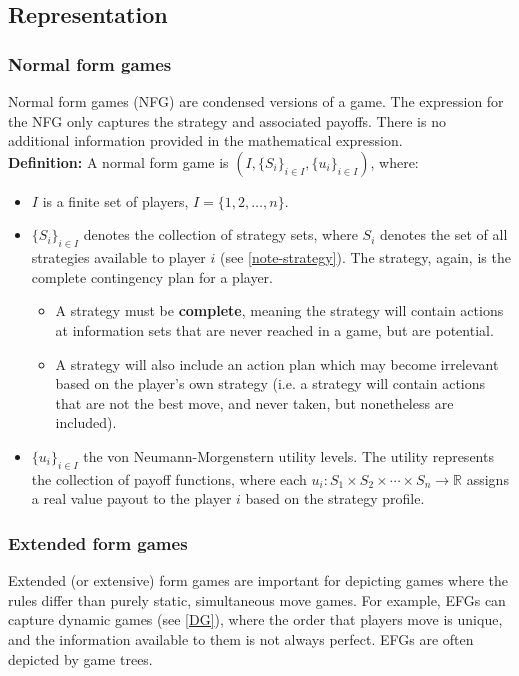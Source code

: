 \documentclass{article}
\begin{document}
\subsection{Representation}

\subsubsection{Normal form games}
Normal form games (NFG) are condensed versions of a game. The expression for the NFG only captures the strategy and associated payoffs. There is no additional information provided in the mathematical expression. \\

\noindent \textbf{Definition:} A normal form game is \((I, \{S_i\}_{i \in I}, \{u_i\}_{i \in I})\), where:
\begin{itemize}
    \item \(I\) is a finite set of players, \(I = \{1, 2, \ldots, n\}\).
    \item \(\{S_i\}_{i \in I}\) denotes the collection of strategy sets, where \(S_i\) denotes the set of all strategies available to player \(i\) (see \ref{note-strategy}). The strategy, again, is the complete contingency plan for a player. 
    \begin{itemize}
        \item A strategy must be \textbf{complete}, meaning the strategy will contain actions at information sets that are never reached in a game, but are potential. 
        \item A strategy will also include an action plan which may become irrelevant based on the player's own strategy (i.e. a strategy will contain actions that are not the best move, and never taken, but nonetheless are included). 
    \end{itemize}
    \item \(\{u_i\}_{i \in I}\) the von Neumann-Morgenstern utility levels. The utility represents the collection of payoff functions, where each $u_i : S_1 \times S_2 \times \cdots \times S_n \to \mathbb{R}$ assigns a real value payout to the player \(i\) based on the strategy profile.
\end{itemize}

\subsubsection{Extended form games}
Extended (or extensive) form games are important for depicting games where the rules differ than purely static, simultaneous move games. For example, EFGs can capture dynamic games (see \ref{DG}), where the order that players move is unique, and the information available to them is not always perfect. EFGs are often depicted by game trees.\\
\end{document}
